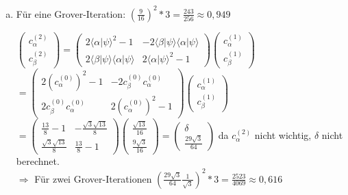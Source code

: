 \documentclass[a4paper]{scrartcl}
\begin{document}
\begin{enumerate}[a)]
\item Für eine Grover-Iteration: $(\frac{9}{16})^2*3 = \frac{243}{256} \approx 0,949$

$\begin{pmatrix} c_{\alpha}^{(2)}\\ c_{\beta}^{(2)}\end{pmatrix} = \begin{pmatrix} 2 \langle \alpha | \psi \rangle^2 -1 & -2 \langle \beta | \psi \rangle \langle \alpha | \psi \rangle \\ 2 \langle \beta | \psi \rangle \langle \alpha | \psi \rangle & 2 \langle \alpha | \psi \rangle^2 -1 \end{pmatrix} \begin{pmatrix} c_{\alpha}^{(1)}\\ c_{\beta}^{(1)}\end{pmatrix}$\\
$=\begin{pmatrix} 2 (c_{\alpha}^{(0)})^2 -1 & -2 c_{\beta}^{(0)} c_{\alpha}^{(0)} \\ 2 c_{\beta}^{(0)} c_{\alpha}^{(0)} & 2 (c_{\alpha}^{(0)})^2 -1 \end{pmatrix} \begin{pmatrix} c_{\alpha}^{(1)}\\ c_{\beta}^{(1)}\end{pmatrix}$\\
$=\begin{pmatrix} \frac{13}{8}-1 & - \frac{\sqrt{3}\sqrt{13}}{8} \\ \frac{\sqrt{3}\sqrt{13}}{8} & \frac{13}{8}-1 \end{pmatrix} \begin{pmatrix}\frac{\sqrt{13}}{16} \\ \frac{9\sqrt{3}}{16}\end{pmatrix} = \begin{pmatrix} \delta \\ \frac{29\sqrt{3}}{64}\end{pmatrix}$ da $c_{\alpha}^{(2)}$ nicht wichtig, $\delta$ nicht berechnet.\\

$\Rightarrow$ Für zwei Grover-Iterationen $(\frac{29\sqrt{3}}{64} \frac{1}{\sqrt{3}})^2*3 = \frac{2523}{4069} \approx 0,616$

\end{enumerate}

\newpage
\end{document}
